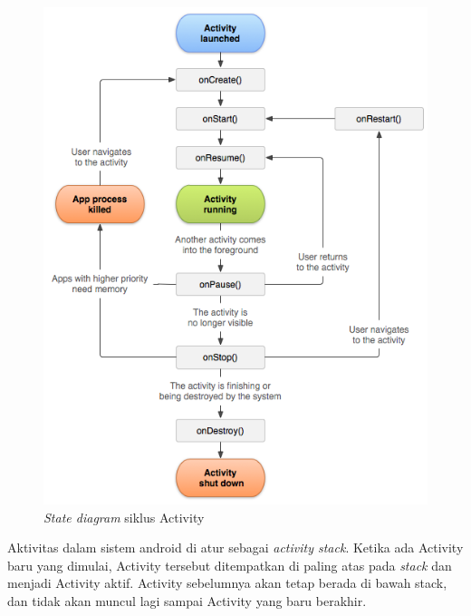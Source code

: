 \documentclass[a4paper,twoside]{article}
\begin{document}
\begin{enumerate}
\label{sssec:activity_lifecycle}
\begin{figure}[htbp]
	\centering
		\includegraphics[scale=0.48]{Gambar/activity-lifecycle.png}
	\caption{\textit{State diagram} siklus Activity}
	\label{fig:activity-lifecycle}
\end{figure}

Aktivitas dalam sistem android di atur sebagai \textit{activity stack}. Ketika ada Activity baru yang dimulai, Activity tersebut ditempatkan di paling atas pada \textit{stack} dan menjadi Activity aktif. Activity sebelumnya akan tetap berada di bawah stack, dan tidak akan muncul lagi sampai Activity yang baru berakhir. 


\end{enumerate}
\end{document}
